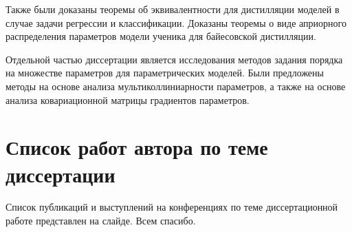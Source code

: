 \documentclass[10pt, twoside]{article}
\begin{document}
Также были доказаны теоремы об эквивалентности для дистилляции моделей в случае задачи регрессии и классификации. Доказаны теоремы о виде априорного распределения параметров модели ученика для байесовской дистилляции.

Отдельной частью диссертации является исследования методов задания порядка на множестве параметров для параметрических моделей. Были предложены методы на основе анализа мультиколлиниарности параметров, а также на основе анализа ковариационной матрицы градиентов параметров.

\section{Список работ автора по теме диссертации}
Список публикаций и выступлений на конференциях по теме диссертационной работе представлен на слайде. Всем спасибо.
\end{document}
